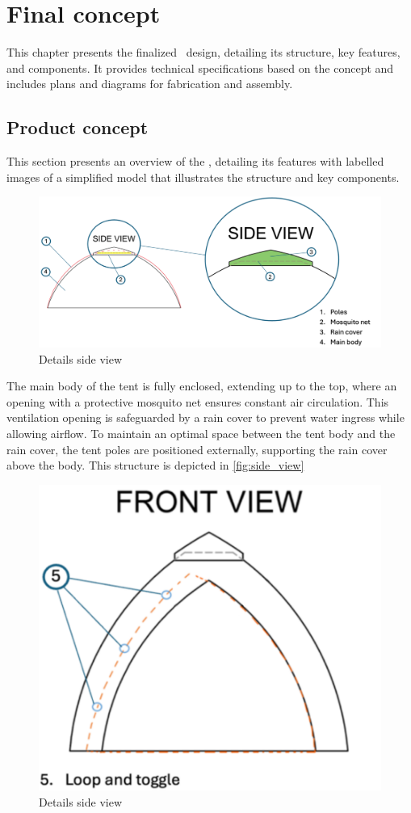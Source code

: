 \documentclass{article}
\begin{document}
\section{Final concept}
\label{sec:final_concept}
This chapter presents the finalized \myc\ design, detailing its structure, key features,
and components. It provides technical specifications based on the concept and includes
plans and diagrams for fabrication and assembly.

\subsection{Product concept}
This section presents an overview of the \myc, detailing its features with labelled
images of a simplified model that illustrates the structure and key components.

\begin{figure}[ht!]
    \centering
    \includegraphics[width=.85\textwidth]{media/side_view.png}
    \caption{Details side view}
    \label{fig:side_view}
\end{figure}

The main body of the tent is fully enclosed, extending up to the top, where an opening with a
protective mosquito net ensures constant air circulation. This ventilation opening is
safeguarded by a rain cover to prevent water ingress while allowing airflow. To maintain an
optimal space between the tent body and the rain cover, the tent poles are positioned
externally, supporting the rain cover above the body. This structure is depicted in \autoref{fig:side_view}

\newpage
\begin{figure}[ht!]
    \centering
    \includegraphics[width=.35\textwidth]{media/front_view.png}
    \caption{Details side view}
    \label{fig:front_view}
\end{figure}
\end{document}

